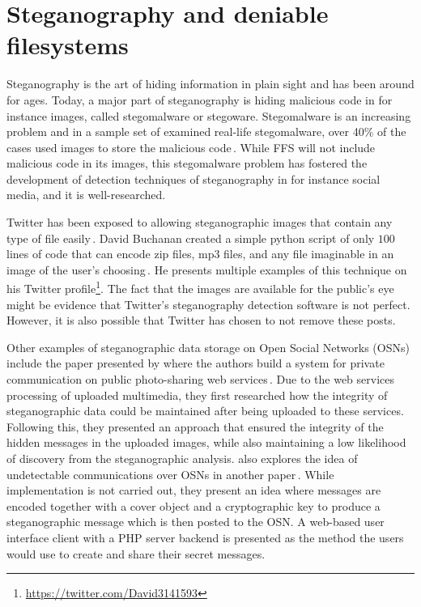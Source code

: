 \section{Steganography and deniable filesystems}
Steganography is the art of hiding information in plain sight and has been around for ages. Today, a major part of steganography is hiding malicious code in for instance images, called stegomalware or stegoware. Stegomalware is an increasing problem and in a sample set of examined real-life stegomalware, over 40\% of the cases used images to store the malicious code\,\cite{stichtingcuingfoundationSIMARGLStegwarePrimer2020}. While FFS will not include malicious code in its images, this stegomalware problem has fostered the development of detection techniques of steganography in for instance social media, and it is well-researched. 

Twitter has been exposed to allowing steganographic images that contain any type of file easily\,\cite{TwitterImagesCan}. David Buchanan created a simple python script of only $100$ lines of code that can encode zip files, mp3 files, and any file imaginable in an image of the user's choosing\,\cite{buchananTweetablepolyglotpng2022}. He presents multiple examples of this technique on his Twitter profile\footnote{\url{https://twitter.com/David3141593}}. The fact that the images are available for the public's eye might be evidence that Twitter's steganography detection software is not perfect. However, it is also possible that Twitter has chosen to not remove these posts.

Other examples of steganographic data storage on Open Social Networks (\gls{OSN}s) include the paper presented by \citeauthor{ningSecretMessageSharing2014} where the authors build a system for private communication on public photo-sharing web services\,\cite{ningSecretMessageSharing2014}. Due to the web services processing of uploaded multimedia, they first researched how the integrity of steganographic data could be maintained after being uploaded to these services. Following this, they presented an approach that ensured the integrity of the hidden messages in the uploaded images, while also maintaining a low likelihood of discovery from the steganographic analysis. \citeauthor{beatoUndetectableCommunicationOnline2014} also explores the idea of undetectable communications over OSNs in another paper\,\cite{beatoUndetectableCommunicationOnline2014}. While implementation is not carried out, they present an idea where messages are encoded together with a cover object and a cryptographic key to produce a steganographic message which is then posted to the OSN. A web-based user interface client with a PHP server backend is presented as the method the users would use to create and share their secret messages.

